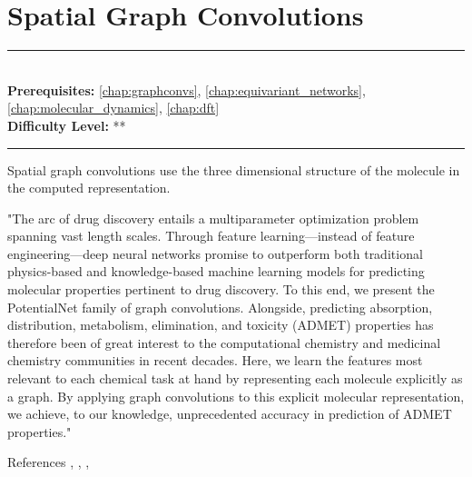 \documentclass[book.tex]{subfiles}
\begin{document}
\chapter{Spatial Graph Convolutions}
\label{chap:spatial_graph_convs}
\noindent\rule{11cm}{0.4pt} \\
\textbf{Prerequisites:} \autoref{chap:graphconvs}, \autoref{chap:equivariant_networks}, \autoref{chap:molecular_dynamics},  \autoref{chap:dft} \\
\textbf{Difficulty Level:} ** \\
\noindent\rule{11cm}{0.4pt}
\vspace{5mm}

Spatial graph convolutions use the three dimensional structure of the molecule in the computed representation.

"The arc of drug discovery entails a multiparameter optimization problem spanning vast length scales. Through feature learning—instead of feature engineering—deep neural networks promise to outperform both traditional physics-based and knowledge-based machine learning models for predicting molecular properties pertinent to drug discovery. To this end, we present the PotentialNet family of graph convolutions. Alongside, predicting absorption, distribution, metabolism, elimination, and toxicity (ADMET) properties has therefore been of great interest to the computational chemistry and medicinal chemistry communities in recent decades. Here, we learn the features most relevant to each chemical task at hand by representing each molecule explicitly as a graph. By applying graph convolutions to this explicit molecular representation, we achieve, to our knowledge, unprecedented accuracy in prediction of ADMET properties."

References \cite{gomes2017atomic}, \cite{danel2020spatial}, \cite{feinberg2018potentialnet}, \cite{feinberg2020improvement}
\end{document}
